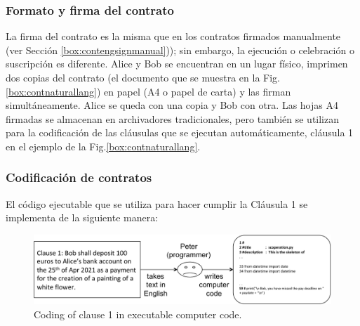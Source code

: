 \documentclass[12pt]{report} %
\begin{document}
\subsubsection{Formato y firma del contrato}

La firma del contrato es la misma que en los contratos firmados manualmente (ver Sección \ref{box:contengsignmanual})); sin embargo, la ejecución o celebración o suscripción es diferente. Alice y Bob se encuentran en un lugar físico, imprimen dos copias del contrato (el documento que se muestra en la Fig. \ref{box:contnaturallang}) en papel (A4 o papel de carta) y las firman simultáneamente. Alice se queda con una copia y Bob con otra. Las hojas A4 firmadas se almacenan en archivadores tradicionales, pero también se utilizan para la codificación de las cláusulas que se ejecutan automáticamente, cláusula 1 en el ejemplo de la Fig.\ref{box:contnaturallang}.


\subsubsection{Codificación de contratos}

El código ejecutable que se utiliza para hacer cumplir la Cláusula 1 se implementa  de la siguiente manera:

\begin{figure}
\centering
\includegraphics[width=0.95\columnwidth]{figures/petercodesnatlangcont.pdf}
\caption{Coding of clause 1 in executable computer code.}
\label{fig:petercodesnatlangcont}
\end{figure}
\end{document}
